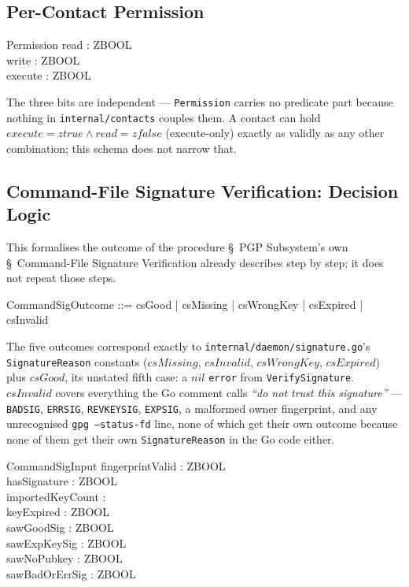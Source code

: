 \documentclass[a4paper,10pt,fleqn]{article}
\begin{document}
\subsection{Per-Contact Permission}

\begin{schema}{Permission}
  read : ZBOOL \\
  write : ZBOOL \\
  execute : ZBOOL
\end{schema}

The three bits are independent --- \texttt{Permission} carries no
predicate part because nothing in \texttt{internal/contacts}
couples them.  A contact can hold $execute = ztrue \land read =
zfalse$ (execute-only) exactly as validly as any other combination;
this schema does not narrow that.

\subsection{Command-File Signature Verification: Decision Logic}

This formalises the outcome of the procedure \S~PGP
Subsystem's own \S~Command-File Signature Verification already
describes step by step; it does not repeat those steps.

\begin{zed}
  CommandSigOutcome ::= csGood | csMissing | csWrongKey
                       | csExpired | csInvalid
\end{zed}

The five outcomes correspond exactly to
\texttt{internal/daemon/signature.go}'s \texttt{SignatureReason}
constants ($csMissing$, $csInvalid$, $csWrongKey$, $csExpired$) plus
$csGood$, its unstated fifth case: a $nil$ \texttt{error} from
\texttt{VerifySignature}.  $csInvalid$ covers everything the Go
comment calls \emph{``do not trust this signature''} ---
\texttt{BADSIG}, \texttt{ERRSIG}, \texttt{REVKEYSIG},
\texttt{EXPSIG}, a malformed owner fingerprint, and any unrecognised
\texttt{gpg --status-fd} line, none of which get their own outcome
because none of them get their own \texttt{SignatureReason} in the
Go code either.

\begin{schema}{CommandSigInput}
  fingerprintValid : ZBOOL \\
  hasSignature : ZBOOL \\
  importedKeyCount : \nat \\
  keyExpired : ZBOOL \\
  sawGoodSig : ZBOOL \\
  sawExpKeySig : ZBOOL \\
  sawNoPubkey : ZBOOL \\
  sawBadOrErrSig : ZBOOL
\end{schema}
\end{document}
